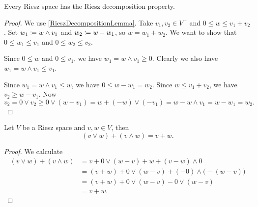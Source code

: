 \begin{theorem} \label{RieszDecomposition}
Every Riesz space has the Riesz decomposition property.
\end{theorem}
\begin{proof}
We use \ref{RieszDecompositionLemma}. Take $v_1,v_2\in V^+$ and $0 \leq w \leq v_1+v_2$. Set $w_1 \coloneqq w\wedge v_1$ and $w_2 \coloneqq w-w_1$, so $w = w_1+w_2$. We want to show that $0\leq w_1 \leq v_1$ and $0 \leq w_2 \leq v_2$.

Since $0\leq w$ and $0\leq v_1$, we have $w_1 = w\wedge v_1 \geq 0$. Clearly we also have $w_1 = w\wedge v_1 \leq v_1$.

Since $w_1 = w\wedge v_1 \leq w$, we have $0 \leq w - w_1 = w_2$. Since $w\leq v_1 + v_2$, we have $v_2 \geq w-v_1$. Now
\[ v_2 = 0\vee v_2 \geq 0\vee (w - v_1) = w + (-w)\vee(-v_1) = w - w\wedge v_1 = w-w_1 = w_2. \]
\end{proof}


\begin{proposition} \label{sumAsMeetJoin}
Let $V$ be a Riesz space and $v,w\in V$, then
\[ (v \vee w) + (v \wedge w) = v+w. \]
\end{proposition}
\begin{proof}
We calculate
\begin{align*}
(v \vee w) + (v \wedge w) &= v + 0 \vee (w-v) + w + (v-w)\wedge 0 \\
&= (v + w) + 0 \vee (w-v) + (-0)\wedge \big(-(w-v)\big) \\
&= (v + w) + 0 \vee (w-v) - 0 \vee (w-v) \\
&= v + w.
\end{align*}
\end{proof}

